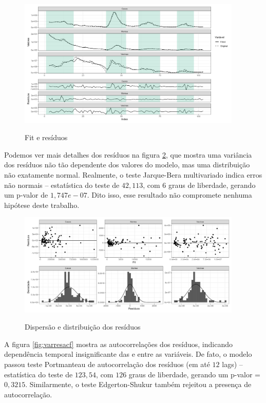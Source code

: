 \documentclass[
    article,
	12pt,				%
	oneside,			%
	a4paper,			%
	english,			%
	brazil,				%
	hyperref = {colorlinks, citecolor=c1d, linkcolor=c2d, urlcolor=c3d, colorlinks}
	]{abntex2}
\newcounter{j}
\begin{document}
\begin{apendicesenv}
\begin{figure}[H]
    \centering
    \caption{Fit e resíduos}
    \includegraphics[width = 0.95\textwidth]{Figuras/diag_fit-res.png}
    \label{fig:varfit}
\end{figure}

Podemos ver mais detalhes dos resíduos na figura \ref{fig:varresdist}, que mostra uma variância dos resíduos não tão dependente dos valores do modelo, mas uma distribuição não exatamente normal. Realmente, o teste Jarque-Bera multivariado indica erros não normais -- estatística do teste de $42,113$, com $6$ graus de liberdade, gerando um p-valor de $1,747e-07$. Dito isso, esse resultado não compromete nenhuma hipótese deste trabalho.

\begin{figure}[H]
    \centering
    \caption{Dispersão e distribuição dos resíduos}
    \includegraphics[width = 0.95\textwidth]{Figuras/diag_disp-dist.png}
    \label{fig:varresdist}
\end{figure}

A figura \ref{fig:varresacf} mostra as autocorrelações dos resíduos, indicando dependência temporal insignificante das e entre as variáveis. De fato, o modelo passou teste Portmanteau de autocorrelação dos resíduos (em até $12$ lags) -- estatística do teste de $123,54$, com $126$ graus de liberdade, gerando um p-valor = $0,3215$. Similarmente, o teste Edgerton-Shukur também rejeitou a presença de autocorrelação.


\end{apendicesenv}
\end{document}

